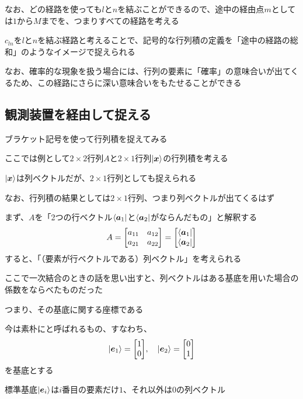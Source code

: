 \documentclass[../book_half_step_linear]{subfiles}
\begin{document}
なお、どの経路を使っても$l$と$n$を結ぶことができるので、途中の経由点$m$としては$1$から$M$までを、つまりすべての経路を考える

$c_{ln}$を$l$と$n$を結ぶ経路と考えることで、記号的な行列積の定義を「途中の経路の総和」のようなイメージで捉えられる

\br

なお、確率的な現象を扱う場合には、行列の要素に「確率」の意味合いが出てくるため、この経路にさらに深い意味合いをもたせることができる

\sectionline
\subsection{観測装置を経由して捉える}

ブラケット記号を使って行列積を捉えてみる

ここでは例として$2\times 2$行列$A$と$2\times 1$行列$\ket{\vb*{x}}$の行列積を考える

$\ket{\vb*{x}}$は列ベクトルだが、$2\times 1$行列としても捉えられる

なお、行列積の結果としては$2\times 1$行列、つまり列ベクトルが出てくるはず

\br

まず、$A$を「2つの行ベクトル$\bra{\vb*{a}_1}$と$\bra{\vb*{a}_2}$がならんだもの」と解釈する
\begin{equation*}
  A = \begin{bmatrix}
    a_{11} & a_{12} \\
    a_{21} & a_{22}
  \end{bmatrix} = \mqty[\bra{\vb*{a}_1} \\ \bra{\vb*{a}_2}]
\end{equation*}
すると、「（要素が行ベクトルである）列ベクトル」を考えられる

\br

ここで一次結合のときの話を思い出すと、列ベクトルはある基底を用いた場合の係数をならべたものだった

つまり、その基底に関する座標である

今は素朴にと呼ばれるもの、すなわち、
\begin{equation*}
  \Ket{\vb*{e}_1} = \mqty[1 \\ 0], \quad \Ket{\vb*{e}_2} = \mqty[0 \\ 1]
\end{equation*}
を基底とする

標準基底$\ket{\vb*{e}_i}$は$i$番目の要素だけ$1$、それ以外は$0$の列ベクトル
\end{document}

